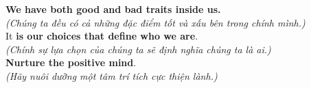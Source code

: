 \begin{baihoc}
  \textbf{We have both good and bad traits inside us.}\\
  \textit{(Chúng ta đều có cả những đặc điểm tốt và xấu bên trong chính mình.)}\\
  It \textbf{is our choices that define who we are}.\\
  \textit{(Chính sự lựa chọn của chúng ta sẽ định nghĩa chúng ta là ai.)}\\
  \textbf{Nurture the positive mind}.\\
  \textit{(Hãy nuôi dưỡng một tâm trí tích cực thiện lành.)}
\end{baihoc}

\vspace{0.8cm}


\ngayDay{}

